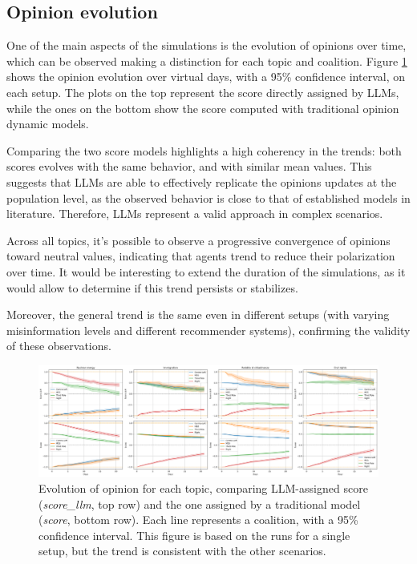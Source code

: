 \subsection{Opinion evolution}
One of the main aspects of the simulations is the evolution of opinions over time, which can be observed making a distinction for each topic and coalition.
Figure \ref{fig:opinion_evolution} shows the opinion evolution over virtual days, with a 95\% confidence interval, on each setup.
The plots on the top represent the score directly assigned by LLMs, while the ones on the bottom show the score computed with traditional opinion dynamic models.

Comparing the two score models highlights a high coherency in the trends: both scores evolves with the same behavior, and with similar mean values.
This suggests that LLMs are able to effectively replicate the opinions updates at the population level, as the observed behavior is close to that of established models in literature. Therefore, LLMs represent a valid approach in complex scenarios.

Across all topics, it's possible to observe a progressive convergence of opinions toward neutral values, indicating that agents trend to reduce their polarization over time.
It would be interesting to extend the duration of the simulations, as it would allow to determine if this trend persists or stabilizes.

Moreover, the general trend is the same even in different setups (with varying misinformation levels and different recommender systems), confirming the validity of these observations.

\begin{figure}[h]
    \centering
    \includegraphics[width=1\linewidth]{Images/Opinions/d21a100m00d_DefaultRecSys.png}
    \caption{Evolution of opinion for each topic, comparing LLM-assigned score (\textit{score\_llm}, top row) and the one assigned by a traditional model (\textit{score}, bottom row).
    Each line represents a coalition, with a 95\% confidence interval.
    This figure is based on the runs for a single setup, but the trend is consistent with the other scenarios.}
    \label{fig:opinion_evolution}
\end{figure}


